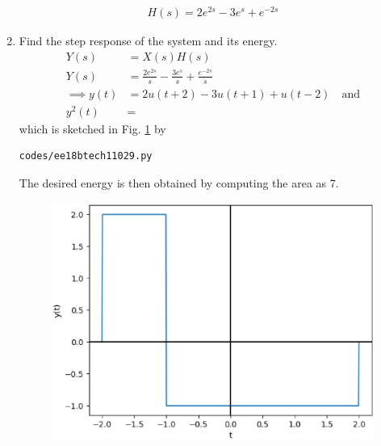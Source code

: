 \begin{enumerate}[label=\thesubsection.\arabic*.,ref=\thesubsection.\theenumi]
 \begin{align}
     H(s)=2{e^{2s}} - 3{e^{s}} + {e^{-2s}}
 \end{align}
%
\item Find the step response of the system and its energy.
\\
\solution 
 \begin{align}
     Y(s)&=X(s)H(s)
\\
     Y(s)&=\frac{2e^{2s}}{s} - \frac{3e^{s}}{s} + \frac{e^{-2s}}{s}
\\
\implies  y(t)&=2u(t+2)-3u(t+1)+u(t-2) \quad \text{and}
\\
y^2(t) &=
 \end{align}
%
which is sketched in Fig. \ref{fig:ee18btech11029_verify} by
\begin{lstlisting}
codes/ee18btech11029.py
\end{lstlisting}
%
 The desired energy is then obtained by computing the area as 7.
\begin{figure}
\centering
\includegraphics[width=\columnwidth]{./figs/ee18btech11029/verify.eps}
\caption{}
\label{fig:ee18btech11029_verify}
\end{figure}
\end{enumerate}

